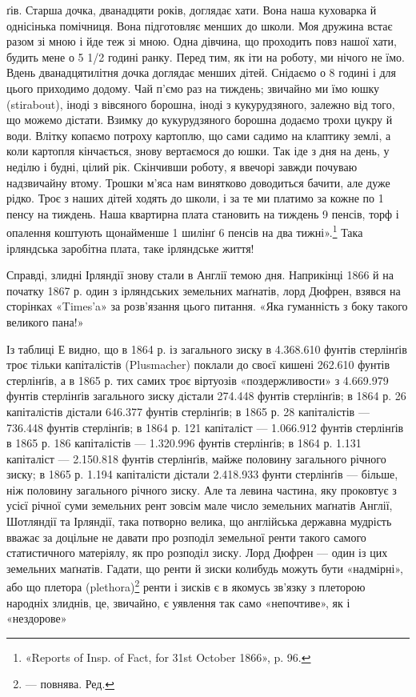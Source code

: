 ґів. Старша дочка, дванадцяти років, доглядає хати. Вона наша
куховарка й однісінька помічниця. Вона підготовляє менших
до школи. Моя дружина встає разом зі мною і йде теж зі мною.
Одна дівчина, що проходить повз нашої хати, будить мене о 5 1/2
годині ранку. Перед тим, як іти на роботу, ми нічого не їмо.
Вдень дванадцятилітня дочка доглядає менших дітей. Снідаємо
о 8 годині і для цього приходимо додому. Чай п’ємо раз на тиждень;
звичайно ми їмо юшку (stirabout), іноді з вівсяного борошна,
іноді з кукурудзяного, залежно від того, що можемо дістати.
Взимку до кукурудзяного борошна додаємо трохи цукру й води.
Влітку копаємо потроху картоплю, що сами садимо на клаптику
землі, а коли картопля кінчається, знову вертаємося до юшки.
Так іде з дня на день, у неділю і будні, цілий рік. Скінчивши
роботу, я ввечорі завжди почуваю надзвичайну втому. Трошки
м’яса нам винятково доводиться бачити, але дуже рідко. Троє
з наших дітей ходять до школи, і за те ми платимо за кожне по
1 пенсу на тиждень. Наша квартирна плата становить на тиждень
9 пенсів, торф і опалення коштують щонайменше 1 шилінґ 6 пенсів
на два тижні».\footnote{
«Reports of Insp. of Fact, for 31st October 1866», p. 96.
} Така ірляндська заробітна плата, таке
ірляндське життя!

Справді, злидні Ірляндії знову стали в Англії темою дня.
Наприкінці 1866 й на початку 1867 р. один з ірляндських земельних
маґнатів, лорд Дюфрен, взявся на сторінках «Times’a» за
розв’язання цього питання. «Яка гуманність з боку такого великого
пана!»

Із таблиці Е видно, що в 1864 р. із загального зиску в 4.368.610
фунтів стерлінґів троє тільки капіталістів (Plusmacher) поклали до
своєї кишені 262.610 фунтів стерлінґів, а в 1865 р. тих самих троє
віртуозів «поздержливости» з 4.669.979 фунтів стерлінґів загального
зиску дістали 274.448 фунтів стерлінґів; в 1864 р. 26 капіталістів
дістали 646.377 фунтів стерлінґів; в 1865 р. 28 капіталістів —
736.448 фунтів стерлінґів; в 1864 р. 121 капіталіст — 1.066.912
фунтів стерлінґів в 1865 р. 186 капіталістів — 1.320.996 фунтів
стерлінґів; в 1864 р. 1.131 капіталіст — 2.150.818 фунтів стерлінґів,
майже половину загального річного зиску; в 1865 р.
1.194 капіталісти дістали 2.418.933 фунти стерлінґів — більше, ніж
половину загального річного зиску. Але та левина частина,
яку проковтує з усієї річної суми земельних рент зовсім мале
число земельних маґнатів Англії, Шотляндії та Ірляндії, така
потворно велика, що англійська державна мудрість вважає за
доцільне не давати про розподіл земельної ренти такого самого
статистичного матеріялу, як про розподіл зиску. Лорд Дюфрен
— один із цих земельних маґнатів. Гадати, що ренти й зиски
колибудь можуть бути «надмірні», або що плетора (plethora)\footnote*{
— повнява. Ред.
}
ренти і зисків є в якомусь зв’язку з плеторою народніх злиднів,
це, звичайно, є уявлення так само «непочтиве», як і «нездорове»